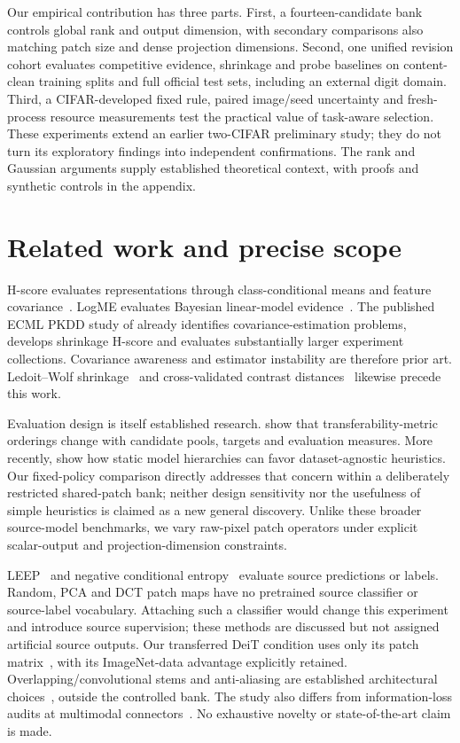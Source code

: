 \documentclass[11pt]{article}
\begin{document}
Our empirical contribution has three parts. First, a fourteen-candidate bank controls global rank and output dimension, with secondary comparisons also matching patch size and dense projection dimensions. Second, one unified revision cohort evaluates competitive evidence, shrinkage and probe baselines on content-clean training splits and full official test sets, including an external digit domain. Third, a CIFAR-developed fixed rule, paired image/seed uncertainty and fresh-process resource measurements test the practical value of task-aware selection. These experiments extend an earlier two-CIFAR preliminary study; they do not turn its exploratory findings into independent confirmations. The rank and Gaussian arguments supply established theoretical context, with proofs and synthetic controls in the appendix.

\section{Related work and precise scope}
H-score evaluates representations through class-conditional means and feature covariance~\citep{bao2019hscore}. LogME evaluates Bayesian linear-model evidence~\citep{you2021logme}. The published ECML PKDD study of \citet{ibrahim2023transferability} already identifies covariance-estimation problems, develops shrinkage H-score and evaluates substantially larger experiment collections. Covariance awareness and estimator instability are therefore prior art. Ledoit--Wolf shrinkage~\citep{ledoit2004covariance} and cross-validated contrast distances~\citep{diedrichsen2016crossvalidated} likewise precede this work.

Evaluation design is itself established research. \citet{agostinelli2022stable} show that transferability-metric orderings change with candidate pools, targets and evaluation measures. More recently, \citet{singh2026benchmark} show how static model hierarchies can favor dataset-agnostic heuristics. Our fixed-policy comparison directly addresses that concern within a deliberately restricted shared-patch bank; neither design sensitivity nor the usefulness of simple heuristics is claimed as a new general discovery. Unlike these broader source-model benchmarks, we vary raw-pixel patch operators under explicit scalar-output and projection-dimension constraints.

LEEP~\citep{nguyen2020leep} and negative conditional entropy~\citep{tran2019transferability} evaluate source predictions or labels. Random, PCA and DCT patch maps have no pretrained source classifier or source-label vocabulary. Attaching such a classifier would change this experiment and introduce source supervision; these methods are discussed but not assigned artificial source outputs. Our transferred DeiT condition uses only its patch matrix~\citep{touvron2021deit}, with its ImageNet-data advantage explicitly retained. Overlapping/convolutional stems and anti-aliasing are established architectural choices~\citep{wu2021cvt,xiao2021convs,qian2021alias}, outside the controlled bank. The study also differs from information-loss audits at multimodal connectors~\citep{li2025lost}. No exhaustive novelty or state-of-the-art claim is made.
\end{document}
